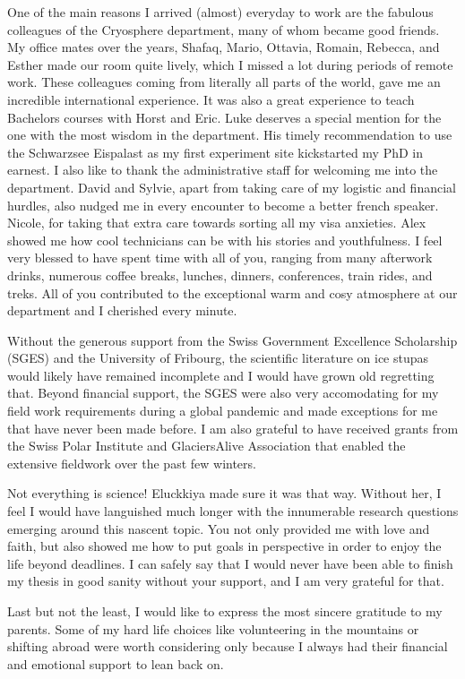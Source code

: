 One of the main reasons I arrived (almost) everyday to work are the fabulous colleagues of the Cryosphere
department, many of whom became good friends. My office mates over the years, Shafaq, Mario, Ottavia, Romain,
Rebecca, and Esther made our room quite lively, which I missed a lot during periods of remote work.
These colleagues coming from literally all parts of the world, gave me an incredible international experience.
It was also a great experience to teach Bachelors courses with Horst and Eric. Luke deserves a special mention
for the one with the most wisdom in the department. His timely recommendation to use the Schwarzsee Eispalast as
my first experiment site kickstarted my PhD in earnest. I also like to thank the administrative staff for
welcoming me into the department. David and Sylvie, apart from taking care of my logistic and financial hurdles,
also nudged me in every encounter to become a better french speaker. Nicole, for taking that extra care towards
sorting all my visa anxieties. Alex showed me how cool technicians can be with his stories and youthfulness. I
feel very blessed to have spent time with all of you, ranging from many afterwork drinks, numerous coffee
breaks, lunches, dinners, conferences, train rides, and treks. All of you contributed to the exceptional warm
and cosy atmosphere at our department and I cherished every minute. 

Without the generous support from the Swiss Government Excellence Scholarship (SGES) and the University of
Fribourg, the scientific literature on ice stupas would likely have remained incomplete and I would have grown
old regretting that. Beyond financial support, the SGES were also very accomodating for my field work
requirements during a global pandemic and made exceptions for me that have never been made before. I am also
grateful to have received grants from the Swiss Polar Institute and GlaciersAlive Association that enabled the
extensive fieldwork over the past few winters. 

Not everything is science! Eluckkiya made sure it was that way. Without her, I feel I would have languished much
longer with the innumerable research questions emerging around this nascent topic. You not only provided me with
love and faith, but also showed me how to put goals in perspective in order to enjoy the life beyond deadlines.
I can safely say that I would never have been able to finish my thesis in good sanity without your support, and
I am very grateful for that. 

Last but not the least, I would like to express the most sincere gratitude to my parents. Some of my hard life
choices like volunteering in the mountains or shifting abroad were worth considering only because I always had
their financial and emotional support to lean back on.



